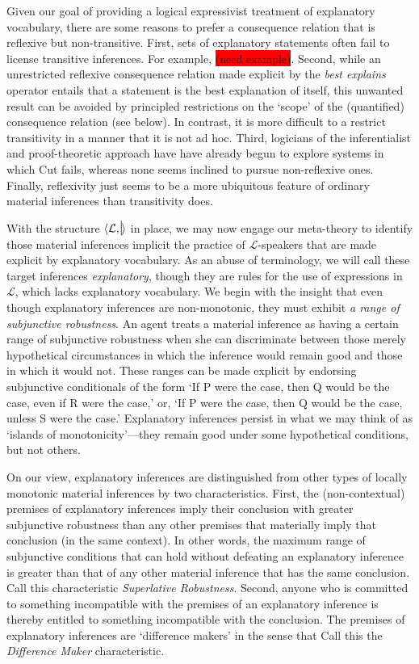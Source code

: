 \documentclass{article}
\newcommand{\nc}{\turnstile{s}{w}{}{}{n}}
\begin{document}
Given our goal of providing a logical expressivist treatment of explanatory vocabulary, there are some reasons to prefer a consequence relation that is reflexive but non-transitive. First, sets of explanatory statements often fail to license transitive inferences. For example, \colorbox{red}{(need example)}. Second, while an unrestricted reflexive consequence relation made explicit by the \textit{best explains} operator entails that a statement is the best explanation of itself, this unwanted result can be avoided by principled restrictions on the `scope' of the (quantified) consequence relation (see below). In contrast, it is more difficult to a restrict transitivity in a manner that it is not ad hoc. Third, logicians of the inferentialist and proof-theoretic approach have have already begun to explore systems in which Cut fails, whereas none seems inclined to pursue non-reflexive ones. Finally, reflexivity just seems to be a more ubiquitous feature of ordinary material inferences than transitivity does.

With the structure $ \langle  \mathcal{L}, \nc \rangle  $ in place, we may now engage our meta-theory to identify those material inferences implicit the practice of $ \mathcal{L} $-speakers that are made explicit by explanatory vocabulary. As an abuse of terminology, we will call these target inferences \textit{explanatory}, though they are rules for the use of expressions in $\mathcal{L} $, which lacks explanatory vocabulary. We begin with the insight that even though explanatory inferences are non-monotonic, they must exhibit \textit{a range of subjunctive robustness}. An agent treats a material inference as having a certain range of subjunctive robustness when she can discriminate between those merely hypothetical circumstances in which the inference would remain good and those in which it would not. These ranges can be made explicit by endorsing subjunctive conditionals of the form `If P were the case, then Q would be the case, even if R were the case,' or, `If P were the case, then Q would be the case, unless S were the case.' Explanatory inferences persist in what we may think of as `islands of monotonicity'---they remain good under some hypothetical conditions, but not others. 

On our view, explanatory inferences are distinguished from other types of locally monotonic material inferences by two characteristics. First, the (non-contextual) premises of explanatory inferences imply their conclusion with greater subjunctive robustness than any other premises that materially imply that conclusion (in the same context). In other words, the maximum range of subjunctive conditions that can hold without defeating an explanatory inference is greater than that of any other material inference that has the same conclusion. Call this characteristic \textit{Superlative Robustness}. Second, anyone who is committed to something incompatible with the premises of an explanatory inference is thereby entitled to something incompatible with the conclusion. The premises of explanatory inferences are `difference makers' in the sense that \color{red}{...help me out with the rest of this sentence, citation from Woodward?} \color{black}  Call this the \textit{Difference Maker} characteristic.
\end{document}
